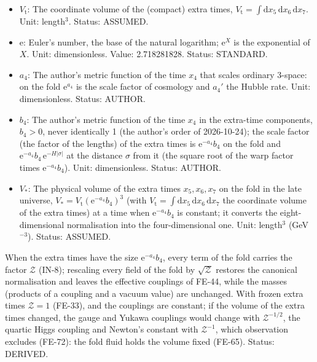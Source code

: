 \documentclass[
  10pt,
]{article}
\begin{document}
\begin{itemize}
  gravity of our world, on the fold),
  \(G_{\mathrm{N}} = 1/M_{\mathrm{Pl}}^2\) with the Planck mass
  \(M_{\mathrm{Pl}} = 1.221\times10^{19}\) GeV. Unit: GeV\(^{-2}\).
  Value: \(6.708\times10^{-39}\) GeV\(^{-2}\). Status: STANDARD.
\item
  \(V_{\mathrm{t}}\): The coordinate volume of the (compact) extra
  times,
  \(V_{\mathrm{t}} = \int\mathrm{d}x_5\,\mathrm{d}x_6\,\mathrm{d}x_7\).
  Unit: length\(^3\). Status: ASSUMED.
\item
  \(\mathrm{e}\): Euler's number, the base of the natural logarithm;
  \(\mathrm{e}^{X}\) is the exponential of \(X\). Unit: dimensionless.
  Value: 2.718281828. Status: STANDARD.
\item
  \(a_4\): The author's metric function of the time \(x_4\) that scales
  ordinary 3-space: on the fold \(\mathrm{e}^{a_4}\) is the scale factor
  of cosmology and \(a_4'\) the Hubble rate. Unit: dimensionless.
  Status: AUTHOR.
\item
  \(b_4\): The author's metric function of the time \(x_4\) in the
  extra-time components, \(b_4 > 0\), never identically 1 (the author's
  order of 2026-10-24); the scale factor (the factor of the lengths) of
  the extra times is \(\mathrm{e}^{-a_4}b_4\) on the fold and
  \(\mathrm{e}^{-a_4}b_4\,\mathrm{e}^{-H\lvert\sigma\rvert}\) at the
  distance \(\sigma\) from it (the square root of the warp factor times
  \(\mathrm{e}^{-a_4}b_4\)). Unit: dimensionless. Status: AUTHOR.
\item
  \(V_*\): The physical volume of the extra times \(x_5, x_6, x_7\) on
  the fold in the late universe,
  \(V_* = V_{\mathrm{t}}(\mathrm{e}^{-a_4}b_4)^3\) (with
  \(V_{\mathrm{t}} = \int\mathrm{d}x_5\,\mathrm{d}x_6\,\mathrm{d}x_7\)
  the coordinate volume of the extra times) at a time when
  \(\mathrm{e}^{-a_4}b_4\) is constant; it converts the
  eight-dimensional normalisation into the four-dimensional one. Unit:
  length\(^3\) (GeV\(^{-3}\)). Status: ASSUMED.
\end{itemize}

When the extra times have the size \(\mathrm{e}^{-a_4}b_4\), every term
of the fold carries the factor \(\mathcal{Z}\) (IN-8); rescaling every
field of the fold by \(\sqrt{\mathcal{Z}}\) restores the canonical
normalisation and leaves the effective couplings of FE-44, while the
masses (products of a coupling and a vacuum value) are unchanged. With
frozen extra times \(\mathcal{Z} = 1\) (FE-33), and the couplings are
constant; if the volume of the extra times changed, the gauge and Yukawa
couplings would change with \(\mathcal{Z}^{-1/2}\), the quartic Higgs
coupling and Newton's constant with \(\mathcal{Z}^{-1}\), which
observation excludes (FE-72): the fold fluid holds the volume fixed
(FE-65). Status: DERIVED.
\end{document}
